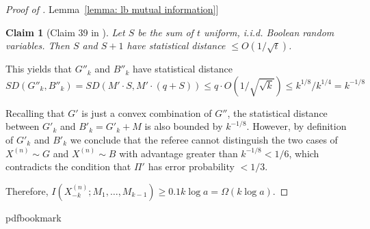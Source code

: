 \documentclass[11pt]{article}
\numberwithin{equation}{section}
\newtheorem{claim}[theorem]{Claim}
\theoremstyle{definition}
\theoremstyle{plain}
\newcommand{\expref}[2]{\hyperref[#2]{#1~\ref{#2}}}
\newcommand{\follows}{\ensuremath{\sim}}
\newcommand{\bigo}[1]{\ensuremath{{{O} \left( {#1} \right)}}}
\newcommand{\bigomega}[1]{\ensuremath{{\Omega \left( {#1} \right)}}}
\begin{document}
\begin{proof}[Proof of \expref{Lemma}{lemma: lb mutual information}]
\begin{claim}[Claim 39 in \cite{Viola:2013we}]
Let $S$ be the sum of $t$ uniform, i.i.d. Boolean random variables.
Then $S$ and $S+1$ have statistical distance $\le \bigo{1/\sqrt{t}}$. 
\end{claim}

This yields that $G''_k$ and $B''_k$ have statistical distance 
$$SD(G''_k, B''_k)=SD(M' \cdot S, M'\cdot(q+S))\le q\cdot \bigo{1/\sqrt{\sqrt{k}}}\le k^{1/8}/k^{1/4}=k^{-1/8}$$

Recalling that $G'$ is just a convex combination of $G''$, 
the statistical distance between $G'_k$ and $B'_k=G'_k+M$ is also bounded by $k^{-1/8}$. 
%
However, by definition of $G'_k$ and $B'_k$ we conclude that the referee cannot distinguish the two cases of $X^{(n)}\follows G$ and $X^{(n)}\follows B$ with advantage greater than $k^{-1/8}< 1/6$, which contradicts the condition that $\Pi'$ has error probability $<1/3$.
		
Therefore, 
$I\left(X^{(n)}_{-k}; M_1,\ldots, M_{k-1}\right)\ge 0.1 k\log a=\bigomega{k\log a}$.
\end{proof}	

\nocite{conf-version}

\newcommand{\prelim}{Preliminary version in\ }\newcommand{\prelims}{Preliminary
  versions in\ }
\providecommand{\bibhead}[1]{}
\expandafter\ifx\csname pdfbookmark\endcsname\relax%
  \providecommand{\tocrefpdfbookmark}{}
\else\providecommand{\tocrefpdfbookmark}{%
   \hypertarget{tocreferences}{}%
   \pdfbookmark[1]{References}{tocreferences}}%
\fi
\end{document}
